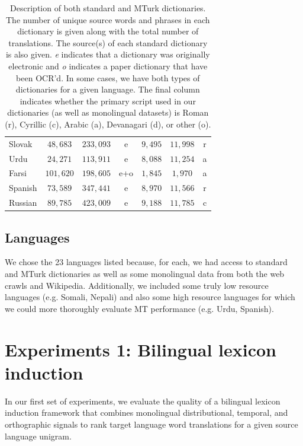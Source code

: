 \documentclass[11pt]{article}
\begin{document}
\begin{table}
\begin{center}
\begin{tabular}{|l||c|c|c||c|c||c|}
Slovak  & $48,683$ & $233,093$   & e  & $9,495$ & $11,998$ & r \\
Urdu  & $24,271$ &  $113,911$  & e & $8,088$ & $11,254$ & a \\
Farsi  & $101,620$ &  $198,605$  &  e+o & $1,845$ & $1,970$ & a \\
Spanish  &  $73,589$  & $347,441$ & e  & $8,970$ & $11,566$ & r \\
Russian  & $89,785$ & $423,009$ & e & $9,188$ & $11,785$ & c \\
\hline
\end{tabular}
\end{center}
\caption{\label{table:dicts}Description of both standard and MTurk dictionaries. The number of unique source words and phrases in each dictionary is given along with the total number of translations. The source(s) of each standard dictionary is also given. {\it e} indicates that a dictionary was originally electronic and {\it o} indicates a paper dictionary that have been OCR'd. In some cases, we have both types of dictionaries for a given language. The final column indicates whether the primary script used in our dictionaries (as well as monolingual datasets) is Roman (r), Cyrillic (c), Arabic (a), Devanagari (d), or other (o).}
\end{table}

\subsection{Languages}
We chose the 23 languages listed because, for each, we had access to standard and MTurk dictionaries as well as some monolingual data from both the web crawls and Wikipedia. Additionally, we included some truly low resource languages (e.g. Somali, Nepali) and also some high resource languages for which we could more thoroughly evaluate MT performance (e.g. Urdu, Spanish).

\section{Experiments 1: Bilingual lexicon induction}\label{sec:lexinduc}
In our first set of experiments, we evaluate the quality of a bilingual lexicon induction framework that combines monolingual distributional, temporal, and orthographic signals to rank target language word translations for a given source language unigram. 
\end{document}
